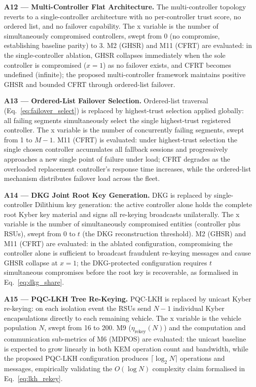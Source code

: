 \documentclass[12pt, a4paper]{report}
\newcommand{\mypar}{\vspace{0.8em}\noindent}
\begin{document}
\mypar
\textbf{A12 --- Multi-Controller Flat Architecture.}
The multi-controller topology reverts to a single-controller
architecture with no per-controller trust score, no ordered list, and
no failover capability. The x variable is the number of simultaneously
compromised controllers, swept from 0 (no compromise, establishing
baseline parity) to 3. M2 (GHSR) and M11 (CFRT) are evaluated: in the
single-controller ablation, GHSR collapses immediately when the sole
controller is compromised ($x = 1$) as no failover exists, and CFRT
becomes undefined (infinite); the proposed multi-controller framework
maintains positive GHSR and bounded CFRT through ordered-list failover.

\mypar
\textbf{A13 --- Ordered-List Failover Selection.}
Ordered-list traversal (Eq.~\eqref{eq:failover_select}) is replaced by
highest-trust selection applied globally: all failing segments
simultaneously select the single highest-trust registered controller.
The x variable is the number of concurrently failing segments, swept
from 1 to $M-1$. M11 (CFRT) is evaluated: under highest-trust selection
the single chosen controller accumulates all fallback sessions and
progressively approaches a new single point of failure under load;
CFRT degrades as the overloaded replacement controller's response time
increases, while the ordered-list mechanism distributes failover load
across the fleet.

\mypar
\textbf{A14 --- DKG Joint Root Key Generation.}
DKG is replaced by single-controller Dilithium key generation: the
active controller alone holds the complete root Kyber key material and
signs all re-keying broadcasts unilaterally. The x variable is the
number of simultaneously compromised entities (controller plus RSUs),
swept from 0 to $t$ (the DKG reconstruction threshold). M2 (GHSR) and
M11 (CFRT) are evaluated: in the ablated configuration, compromising
the controller alone is sufficient to broadcast fraudulent re-keying
messages and cause GHSR collapse at $x = 1$; the DKG-protected
configuration requires $t$ simultaneous compromises before the root
key is recoverable, as formalised in Eq.~\eqref{eq:dkg_share}.

\mypar
\textbf{A15 --- PQC-LKH Tree Re-Keying.}
PQC-LKH is replaced by unicast Kyber re-keying: on each isolation event
the RSUs send $N-1$ individual Kyber encapsulations directly to each
remaining vehicle. The x variable is the vehicle population $N$, swept
from 16 to 200. M9 ($\eta_{\text{rekey}}(N)$) and the computation and
communication sub-metrics of M6 (MDPOS) are evaluated: the unicast
baseline is expected to grow linearly in both KEM operation count and
bandwidth, while the proposed PQC-LKH configuration produces
$\lceil\log_2 N\rceil$ operations and messages, empirically validating
the $O(\log N)$ complexity claim formalised in
Eq.~\eqref{eq:lkh_rekey}.
\end{document}
